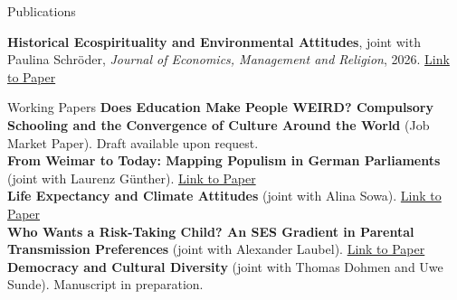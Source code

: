 \documentclass[roman]{resume}
\begin{document}
\begin{rSection}{Publications}
	
	\textbf{Historical Ecospirituality and Environmental Attitudes},
	joint with Paulina Schröder,
	\textit{Journal of Economics, Management and Religion}, 2026.
		\href{https://www.worldscientific.com/doi/10.1142/S2737436X25500104}{Link to Paper}
\end{rSection}
	\begin{rSection}{Working Papers}
		\textbf{Does Education Make People WEIRD? Compulsory Schooling and the Convergence of Culture Around the World} (Job Market Paper). Draft available upon request. \\ [1.5ex]
		\textbf{From Weimar to Today: Mapping Populism in German Parliaments} \normalfont(joint with Laurenz Günther). \href{https://papers.ssrn.com/sol3/papers.cfm?abstract_id=4912851}{Link to Paper}\\ [1.5ex]
		\textbf{Life Expectancy and Climate Attitudes}
		\normalfont(joint with Alina Sowa). \href{https://drive.google.com/file/d/1fi5vm07a9aTq9VT7lC5N_Tpyx22E5yqa/view}{Link to Paper} \\ [1.5ex]
		\textbf{Who Wants a Risk-Taking Child? An SES Gradient in Parental Transmission Preferences} \normalfont(joint with Alexander Laubel). \href{https://drive.google.com/file/d/1ow3AMx1f_VdP5Z0zLI-MMkd8O0PuIIGo/view}{Link to Paper} \\ [1.5ex]
		\textbf{Democracy and Cultural Diversity} \normalfont(joint with Thomas Dohmen and Uwe Sunde). Manuscript in preparation.

	\end{rSection}
	
	
	
	
\end{document}
